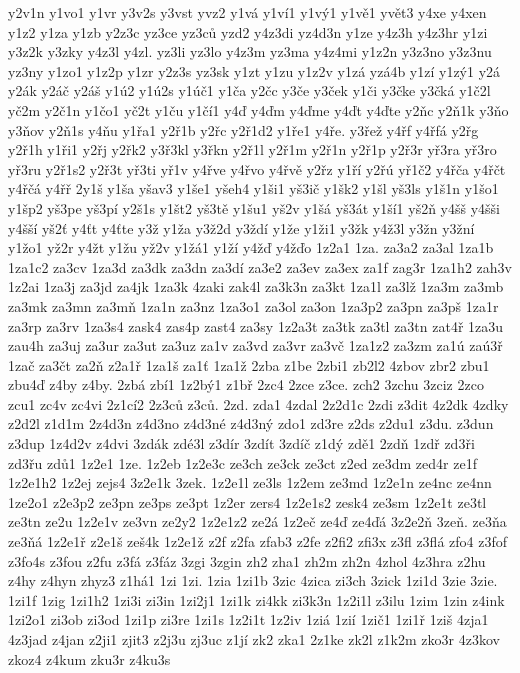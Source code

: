 y2v1n
y1vo1
y1vr
y3v2s
y3vst
yvz2
y1vá
y1ví1
y1vý1
y1vě1
yvět3
y4xe
y4xen
y1z2
y1za
y1zb
y2z3c
yz3ce
yz3ců
yzd2
y4z3di
yz4d3n
y1ze
y4z3h
y4z3hr
y1zi
y3z2k
y3zky
y4z3l
y4zl.
yz3li
yz3lo
y4z3m
yz3ma
y4z4mi
y1z2n
y3z3no
y3z3nu
yz3ny
y1zo1
y1z2p
y1zr
y2z3s
yz3sk
y1zt
y1zu
y1z2v
y1zá
yzá4b
y1zí
y1zý1
y2á
y2ák
y2áč
y2áš
y1ú2
y1ú2s
y1úč1
y1ča
y2čc
y3če
y3ček
y1či
y3čke
y3čká
y1č2l
yč2m
y2č1n
y1čo1
yč2t
y1ču
y1čí1
y4ď
y4ďm
y4ďme
y4ďt
y4ďte
y2ňc
y2ň1k
y3ňo
y3ňov
y2ň1s
y4ňu
y1řa1
y2ř1b
y2řc
y2ř1d2
y1ře1
y4ře.
y3řež
y4řf
y4řfá
y2řg
y2ř1h
y1ři1
y2řj
y2řk2
y3ř3kl
y3řkn
y2ř1l
y2ř1m
y2ř1n
y2ř1p
y2ř3r
yř3ra
yř3ro
yř3ru
y2ř1s2
y2ř3t
yř3ti
yř1v
y4řve
y4řvo
y4řvě
y2řz
y1ří
y2řú
yř1č2
y4řča
y4řčt
y4řčá
y4řř
2y1š
y1ša
yšav3
y1še1
yšeh4
y1ši1
yš3ič
y1šk2
y1šl
yš3ls
y1š1n
y1šo1
y1šp2
yš3pe
yš3pí
y2š1s
y1št2
yš3tě
y1šu1
yš2v
y1šá
yš3át
y1ší1
yš2ň
y4šš
y4šši
y4šší
yš2ť
y4ťt
y4ťte
y3ž
y1ža
y3ž2d
y3ždí
y1že
y1ži1
y3žk
y4ž3l
y3žn
y3žní
y1žo1
yž2r
y4žt
y1žu
yž2v
y1žá1
y1ží
y4žď
y4žďo
1z2a1
1za.
za3a2
za3al
1za1b
1za1c2
za3cv
1za3d
za3dk
za3dn
za3dí
za3e2
za3ev
za3ex
za1f
zag3r
1za1h2
zah3v
1z2ai
1za3j
za3jd
za4jk
1za3k
4zaki
zak4l
za3k3n
za3kt
1za1l
za3lž
1za3m
za3mb
za3mk
za3mn
za3mň
1za1n
za3nz
1za3o1
za3ol
za3on
1za3p2
za3pn
za3pš
1za1r
za3rp
za3rv
1za3s4
zask4
zas4p
zast4
za3sy
1z2a3t
za3tk
za3tl
za3tn
zat4ř
1za3u
zau4h
za3uj
za3ur
za3ut
za3uz
za1v
za3vd
za3vr
za3vč
1za1z2
za3zm
za1ú
zaú3ř
1zač
za3čt
za2ň
z2a1ř
1za1š
za1ť
1za1ž
2zba
z1be
2zbi1
zb2l2
4zbov
zbr2
zbu1
zbu4ď
z4by
z4by.
2zbá
zbí1
1z2bý1
z1bř
2zc4
2zce
z3ce.
zch2
3zchu
3zciz
2zco
zcu1
zc4v
zc4vi
2z1cí2
2z3ců
z3ců.
2zd.
zda1
4zdal
2z2d1c
2zdi
z3dit
4z2dk
4zdky
z2d2l
z1d1m
2z4d3n
z4d3no
z4d3né
z4d3ný
zdo1
zd3re
z2ds
z2du1
z3du.
z3dun
z3dup
1z4d2v
z4dvi
3zdák
zdé3l
z3dír
3zdít
3zdíč
z1dý
zdě1
2zdň
1zdř
zd3ři
zd3řu
zdů1
1z2e1
1ze.
1z2eb
1z2e3c
ze3ch
ze3ck
ze3ct
z2ed
ze3dm
zed4r
ze1f
1z2e1h2
1z2ej
zejs4
3z2e1k
3zek.
1z2e1l
ze3ls
1z2em
ze3md
1z2e1n
ze4nc
ze4nn
1ze2o1
z2e3p2
ze3pn
ze3ps
ze3pt
1z2er
zers4
1z2e1s2
zesk4
ze3sm
1z2e1t
ze3tl
ze3tn
ze2u
1z2e1v
ze3vn
ze2y2
1z2e1z2
ze2á
1z2eč
ze4ď
ze4ďá
3z2e2ň
3zeň.
ze3ňa
ze3ňá
1z2e1ř
z2e1š
zeš4k
1z2e1ž
z2f
z2fa
zfab3
z2fe
z2fi2
zfi3x
z3fl
z3flá
zfo4
z3fof
z3fo4s
z3fou
z2fu
z3fá
z3fáz
3zgi
3zgin
zh2
zha1
zh2m
zh2n
4zhol
4z3hra
z2hu
z4hy
z4hyn
zhyz3
z1há1
1zi
1zi.
1zia
1zi1b
3zic
4zica
zi3ch
3zick
1zi1d
3zie
3zie.
1zi1f
1zig
1zi1h2
1zi3i
zi3in
1zi2j1
1zi1k
zi4kk
zi3k3n
1z2i1l
z3ilu
1zim
1zin
z4ink
1zi2o1
zi3ob
zi3od
1zi1p
zi3re
1zi1s
1z2i1t
1z2iv
1ziá
1zií
1zič1
1zi1ř
1ziš
4zja1
4z3jad
z4jan
z2ji1
zjit3
z2j3u
zj3uc
z1jí
zk2
zka1
2z1ke
zk2l
z1k2m
zko3r
4z3kov
zkoz4
z4kum
zku3r
z4ku3s
